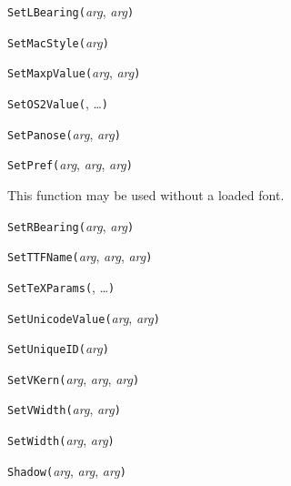 
\noindent\texttt{SetLBearing(}\textit{arg}, \textit{arg}\texttt{)}


\noindent\texttt{SetMacStyle(}\textit{arg}\texttt{)}


\noindent\texttt{SetMaxpValue(}\textit{arg}, \textit{arg}\texttt{)}


\noindent\texttt{SetOS2Value(}, \ldots\texttt{)}


\noindent\texttt{SetPanose(}\textit{arg}, \textit{arg}\texttt{)}


\noindent\texttt{SetPref(}\textit{arg}, \textit{arg}, \textit{arg}\texttt{)}

This function may be used without a loaded font.


\noindent\texttt{SetRBearing(}\textit{arg}, \textit{arg}\texttt{)}


\noindent\texttt{SetTTFName(}\textit{arg}, \textit{arg}, \textit{arg}\texttt{)}


\noindent\texttt{SetTeXParams(}, \ldots\texttt{)}


\noindent\texttt{SetUnicodeValue(}\textit{arg}, \textit{arg}\texttt{)}


\noindent\texttt{SetUniqueID(}\textit{arg}\texttt{)}


\noindent\texttt{SetVKern(}\textit{arg}, \textit{arg}, \textit{arg}\texttt{)}


\noindent\texttt{SetVWidth(}\textit{arg}, \textit{arg}\texttt{)}


\noindent\texttt{SetWidth(}\textit{arg}, \textit{arg}\texttt{)}


\noindent\texttt{Shadow(}\textit{arg}, \textit{arg}, \textit{arg}\texttt{)}


